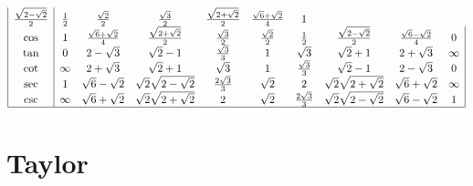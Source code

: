 \begin{definition}
\[\begin{array}{|c|ccccccccc|}
        \frac{ \sqrt{2 - \sqrt{2}} } {2} &
        \frac{1}{2} &
        \frac{\sqrt{2}}{2} &
        \frac{\sqrt{3}}{2} &
        \frac{ \sqrt{2 + \sqrt{2}} } {2} &
        \frac{ \sqrt{6} + \sqrt{2} } {4} &
        1 \\
        \cos &
        1 &
        \frac{\sqrt{6}+\sqrt{2}}{4} &
        \frac{ \sqrt{2 + \sqrt{2}} } {2} &
        \frac{\sqrt{3}}{2} &
        \frac{\sqrt{2}}{2} &
        \frac{1}{2} &
        \frac{ \sqrt{2 - \sqrt{2}} } {2} &
        \frac{ \sqrt{6} - \sqrt{2}} {4} &
        0 \\
        \tan &
        0 &
        2-\sqrt{3} &
        \sqrt{2} - 1 &
        \frac{\sqrt{3}}{3} &
        1 &
        \sqrt{3} &
        \sqrt{2} + 1 &
        2+\sqrt{3} &
        \infty \\
        \cot &
        \infty &
        2+\sqrt{3} &
        \sqrt{2} + 1 &
        \sqrt{3} &
        1 &
        \frac{\sqrt{3}}{3} &
        \sqrt{2} - 1 &
        2-\sqrt{3} &
        0 \\
        \sec &
        1 &
        \sqrt{6} - \sqrt{2} &
        \sqrt{2} \sqrt{ 2 - \sqrt{2} } &
        \frac{2\sqrt{3}}{3} &
        \sqrt{2} &
        2 &
        \sqrt{2} \sqrt{ 2 + \sqrt{2} } &
        \sqrt{6}+\sqrt{2} &
        \infty \\
        \csc &
        \infty &
        \sqrt{6}+\sqrt{2} &
        \sqrt{2} \sqrt{ 2 + \sqrt{2} } &
        2 &
        \sqrt{2} &
        \frac{2\sqrt{3}}{3} &
        \sqrt{2} \sqrt{ 2 - \sqrt{2} } &
        \sqrt{6} - \sqrt{2} &
        1 \\\hline
        \end{array}
    \]

\end{definition}

\section{Taylor}














